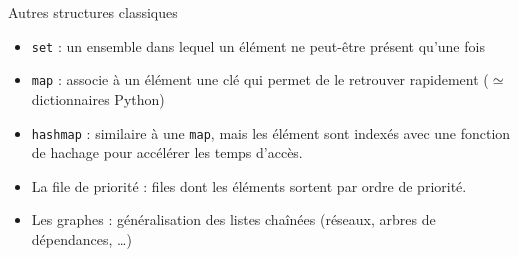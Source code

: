 \begin{frame}{Autres structures classiques}
\begin{itemize}
\item \texttt{set} : un ensemble dans lequel un élément ne peut-être présent qu'une fois
\item \texttt{map} : associe à un élément une clé qui permet de le retrouver rapidement ($\simeq$ dictionnaires Python)
\item \texttt{hashmap} : similaire à une \texttt{map}, mais les élément sont indexés avec une fonction de hachage pour accélérer les temps d'accès.
\item La file de priorité : files dont les éléments sortent par ordre de priorité.
\item Les graphes : généralisation des listes chaînées (réseaux, arbres de dépendances, \dots)
\end{itemize}
\end{frame}


